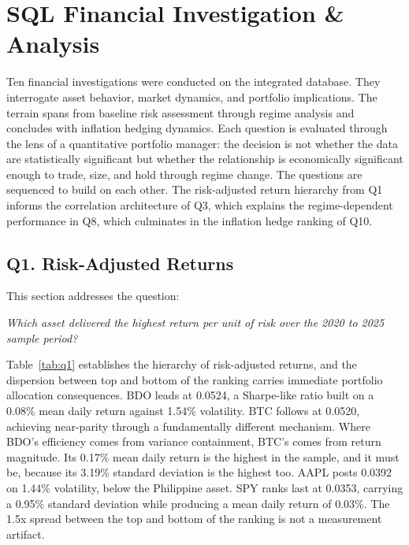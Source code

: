 \section{SQL Financial Investigation \& Analysis}

Ten financial investigations were conducted on the integrated database. They interrogate asset behavior, market dynamics, and portfolio implications. The terrain spans from baseline risk assessment through regime analysis and concludes with inflation hedging dynamics. Each question is evaluated through the lens of a quantitative portfolio manager: the decision is not whether the data are statistically significant but whether the relationship is economically significant enough to trade, size, and hold through regime change. The questions are sequenced to build on each other. The risk-adjusted return hierarchy from Q1 informs the correlation architecture of Q3, which explains the regime-dependent performance in Q8, which culminates in the inflation hedge ranking of Q10.

\subsection{Q1. Risk-Adjusted Returns}

This section addresses the question:

\noindent\textit{Which asset delivered the highest return per unit of risk over the 2020 to 2025 sample period?}



Table~\ref{tab:q1} establishes the hierarchy of risk-adjusted returns, and the dispersion between top and bottom of the ranking carries immediate portfolio allocation consequences. BDO leads at 0.0524, a Sharpe-like ratio built on a 0.08\% mean daily return against 1.54\% volatility. BTC follows at 0.0520, achieving near-parity through a fundamentally different mechanism. Where BDO's efficiency comes from variance containment, BTC's comes from return magnitude. Its 0.17\% mean daily return is the highest in the sample, and it must be, because its 3.19\% standard deviation is the highest too. AAPL posts 0.0392 on 1.44\% volatility, below the Philippine asset. SPY ranks last at 0.0353, carrying a 0.95\% standard deviation while producing a mean daily return of 0.03\%. The 1.5x spread between the top and bottom of the ranking is not a measurement artifact.

